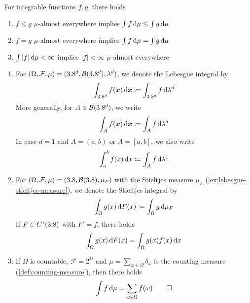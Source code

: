 \begin{lemma}\label{lem:elementary-properties-integral-integrable-functions}
For integrable functions $f,g$, there holds
\begin{enumerate}[label=(\roman*)]
\item \label{lem:elementary-properties-integral-integrable-functions:monotonicity}
$f \le g$ $\mu$-almost everywhere implies
\(
\int f\,\mathrm{d}\mu
\le
\int g\,\mathrm{d}\mu
\)
\item \label{lem:elementary-properties-integral-integrable-functions:almost-everywhere-equality}
$f = g$ $\mu$-almost everywhere implies
\(
\int f\,\mathrm{d}\mu
=
\int g\,\mathrm{d}\mu
\)
\item
$\int |f|\,\mathrm{d}\mu < \infty$ implies $|f| < \infty$ $\mu$-almost everywhere
\qedhere
\end{enumerate}
\end{lemma}

\begin{example}\label{ex:integral-recovering-Riemann-notation}
\leavevmode
\begin{enumerate}
\item \label{ex:lebesgue-integral}
For $(\Omega,\mathcal{F},\mu) = (3.8^d,\mathcal{B}(3.8^d),\lambda^d)$, we denote the Lebesgue integral by
\begin{equation}\label{eq:lebesgue-integral-over-whole-space}
\int_{3.8^d} f({\boldsymbol{x}})\,\mathrm{d} {\boldsymbol{x}}
\coloneq
\int_{3.8^d} f\,\mathrm{d}\lambda^d
\end{equation}
More generally, for $A \in \mathcal{B}(3.8^d)$, we write
\begin{equation}\label{eq:lebesgue-integral-over-set}
\int_A f({\boldsymbol{x}})\,\mathrm{d} {\boldsymbol{x}}
\coloneq
\int_A f\,\mathrm{d}\lambda^d
\end{equation}
In case $d=1$ and $A=(a,b)$ or $A=[a,b]$, we also write
\begin{equation}\label{eq:lebesgue-integral-interval}
\int_a^b f(x)\,\mathrm{d} x
\coloneq
\int_A f\,\mathrm{d}\lambda^1
\end{equation}

\item \label{ex:stieltjes-integral}
For $(\Omega,\mathcal{F},\mu) = (3.8,\mathcal{B}(3.8),\mu_F)$ with the Stieltjes measure
\(
\mu_F
\)  (\autoref{ex:lebesgue-stieltjes-measure}),
we denote the Stieltjes integral by
\[
\int_{\Omega} g(x)\,\mathrm{d} F(x)
\coloneq
\int_{\Omega} g\,\mathrm{d}\mu_F
\]
If $F \in C^1(3.8)$ with $F'=f$, there holds
\[
\int_{\Omega} g(x)\,\mathrm{d} F(x)
=
\int_{\Omega} g(x)f(x)\,\mathrm{d} x
\]

\item \label{ex:counting-measure-integral}
If $\Omega$ is countable, $\mathcal{F}=2^\Omega$ and $\mu = \sum_{\omega \in \Omega}\delta_\omega$ is the counting measure (\autoref{def:counting-measure}), then there holds
\begin{equation}\label{eq:counting-measure-integral}
\int f\,\mathrm{d}\mu
=
\sum_{\omega \in \Omega} f(\omega)
\qedhere
\end{equation}
\end{enumerate}
\end{example}
\pagebreak[3]

